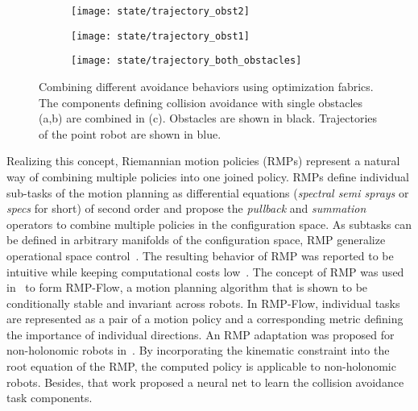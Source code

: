 %
\begin{figure}[h]
  \centering
  \begin{subfigure}{0.33\linewidth}
    \centering
    \texttt{[image: state/trajectory\_obst2]}
    \caption{}
    \label{subfig:trajectory_obst1}
  \end{subfigure}%
  \begin{subfigure}{0.33\linewidth}
    \centering
    \texttt{[image: state/trajectory\_obst1]}
    \caption{}
    \label{subfig:trajectory_obst2}
  \end{subfigure}%
  \begin{subfigure}{0.33\linewidth}
    \centering
    \texttt{[image: state/trajectory\_both\_obstacles]}
    \caption{}
    \label{subfig:trajectory_both_obstacles}
  \end{subfigure}
  \caption{
    Combining different avoidance behaviors using optimization fabrics. The
    components defining collision avoidance with single obstacles (a,b) are
    combined in (c). Obstacles are shown in black. Trajectories of the point
    robot are shown in blue.
  }
  \label{fig:spec_combination}
\end{figure}
%
Realizing this concept, Riemannian motion policies (RMPs) represent a
natural way of combining multiple policies into one joined policy.
RMPs define individual sub-tasks of the motion planning as
differential equations (\textit{spectral semi sprays} or
\textit{specs} for short) of second order and propose the
\textit{pullback} and \textit{summation} operators to combine multiple policies
in the configuration space. As subtasks can be defined in arbitrary manifolds
of the configuration space, RMP generalize operational space
control~\cite{Khatib1987}. The resulting behavior of RMP was reported to be
intuitive while keeping computational costs low~\cite{Ratliff2018}. The concept
of RMP was used in~ to form RMP-Flow, a motion
planning algorithm that is shown to be conditionally stable and invariant
across robots. In RMP-Flow, individual tasks are represented as a pair of
a motion policy and a corresponding metric defining the importance of
individual directions. An RMP adaptation was proposed for non-holonomic robots
in~\cite{Meng2019}. By incorporating the kinematic constraint into the root
equation of the RMP, the computed policy is applicable to non-holonomic robots.
Besides, that work proposed a neural net to learn the collision avoidance task
components. 

